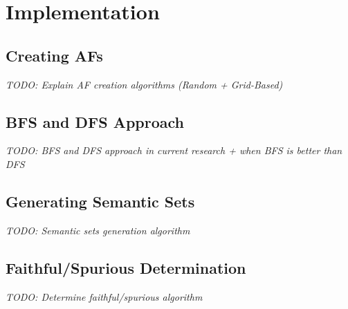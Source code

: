 \chapter{Implementation}


\section{Creating AFs}
\textit{TODO: Explain AF creation algorithms (Random + Grid-Based)}



\section{BFS and DFS Approach}
\textit{TODO: BFS and DFS approach in current research + when BFS is better than DFS}

\section{Generating Semantic Sets}
\textit{TODO: Semantic sets generation algorithm}

\section{Faithful/Spurious Determination}
\textit{TODO: Determine faithful/spurious algorithm}
